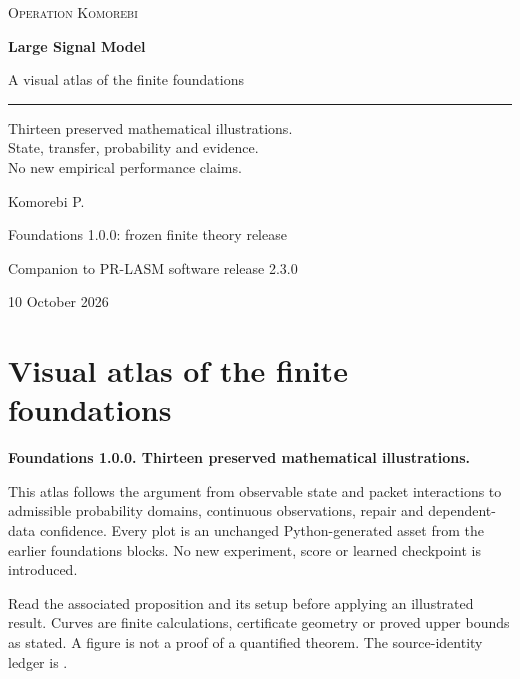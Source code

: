\documentclass[11pt,letterpaper]{article}
\begin{document}
\hypersetup{pageanchor=false}
\begin{titlepage}
\vspace*{0.5in}
{\small\textsc{Operation Komorebi}\par}
\vspace{0.72in}
{\fontsize{33}{39}\selectfont\bfseries Large Signal Model\par}
\vspace{0.3in}
{\fontsize{21}{27}\selectfont A visual atlas of the finite foundations\par}
\vspace{0.45in}
\rule{\textwidth}{0.45pt}\par
\vspace{0.3in}
\begin{minipage}{0.95\textwidth}
\large
Thirteen preserved mathematical illustrations.\\State, transfer, probability and evidence.\\No new empirical performance claims.
\end{minipage}
\vfill
{\Large Komorebi P.\par}
\vspace{0.2in}
{\normalsize Foundations 1.0.0: frozen finite theory release\par}
{\normalsize Companion to PR-LASM software release 2.3.0\par}
{\normalsize 10 October 2026\par}
\end{titlepage}
\hypersetup{pageanchor=true}
\begingroup\footnotesize\setlength{\cftbeforesecskip}{0pt}\tableofcontents\endgroup\bigskip

\section{Visual atlas of the finite
foundations}\label{visual-atlas-of-the-finite-foundations}

\textbf{Foundations 1.0.0. Thirteen preserved mathematical
illustrations.}

This atlas follows the argument from observable state and packet
interactions to admissible probability domains, continuous observations,
repair and dependent-data confidence. Every plot is an unchanged
Python-generated asset from the earlier foundations blocks. No new
experiment, score or learned checkpoint is introduced.

Read the associated proposition and its setup before applying an
illustrated result. Curves are finite calculations, certificate geometry
or proved upper bounds as stated. A figure is not a proof of a
quantified theorem. The source-identity ledger is
.
\end{document}
